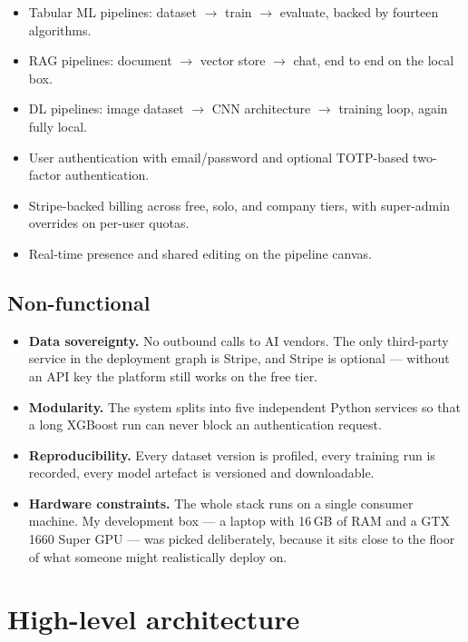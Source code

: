 \documentclass[12pt, a4paper]{report}
\begin{document}
\begin{itemize}
    \item Tabular ML pipelines: dataset $\to$ train $\to$ evaluate,
        backed by fourteen algorithms.
    \item RAG pipelines: document $\to$ vector store $\to$ chat, end
        to end on the local box.
    \item DL pipelines: image dataset $\to$ CNN architecture $\to$
        training loop, again fully local.
    \item User authentication with email/password and optional TOTP-based
        two-factor authentication.
    \item Stripe-backed billing across free, solo, and company tiers,
        with super-admin overrides on per-user quotas.
    \item Real-time presence and shared editing on the pipeline canvas.
\end{itemize}

\subsection{Non-functional}

\begin{itemize}
    \item \textbf{Data sovereignty.} No outbound calls to AI vendors.
        The only third-party service in the deployment graph is Stripe,
        and Stripe is optional --- without an API key the platform
        still works on the free tier.
    \item \textbf{Modularity.} The system splits into five independent
        Python services so that a long XGBoost run can never block an
        authentication request.
    \item \textbf{Reproducibility.} Every dataset version is profiled,
        every training run is recorded, every model artefact is
        versioned and downloadable.
    \item \textbf{Hardware constraints.} The whole stack runs on a
        single consumer machine. My development box --- a laptop with
        16\,GB of RAM and a GTX 1660 Super GPU --- was picked
        deliberately, because it sits close to the floor of what
        someone might realistically deploy on.
\end{itemize}

\section{High-level architecture}
\end{document}
